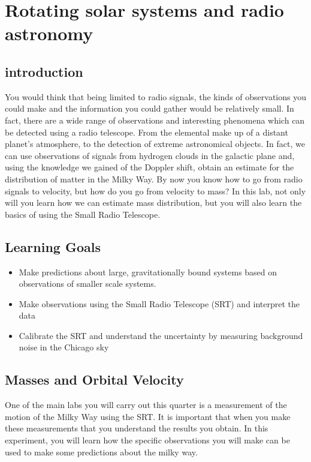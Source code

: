 \chapter{Rotating solar systems and radio astronomy}

\section{introduction} 
You would think that being limited to radio signals, the kinds of observations you could make and the information you could gather would be relatively small. In fact, there are a wide range of observations and interesting phenomena which can be detected using a radio telescope. From the elemental make up of a distant planet's atmosphere, to the detection of extreme astronomical objects. In fact, we can use observations of signals from hydrogen clouds in the galactic plane and, using the knowledge we gained of the Doppler shift, obtain an estimate for the distribution of matter in the Milky Way. By now you know how to go from radio signals to velocity, but how do you go from velocity to mass? In this lab, not only will you learn how we can estimate mass distribution, but you will also learn the basics of using the Small Radio Telescope. 

\section{Learning Goals}
\begin{itemize}
	\item Make predictions about large, gravitationally bound systems based on observations of smaller scale systems.
	
	\item Make observations using the Small Radio Telescope (SRT) and interpret the data
	
	\item Calibrate the SRT and understand the uncertainty by measuring background noise in the Chicago sky 
\end{itemize}

\section{Masses and Orbital Velocity} %
One of the main labs you will carry out this quarter is a measurement of the motion of the Milky Way using the SRT. It is important that when you make these measurements that you understand the results you obtain. In this experiment, you will learn how the specific observations you will make can be used to make some predictions about the milky way. 


